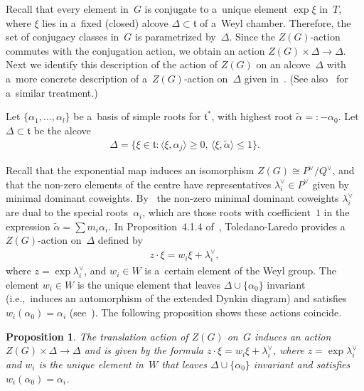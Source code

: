 \documentclass[pdftex]{sigma}
\numberwithin{equation}{section}
\newtheorem{Proposition}[Theorem]{Proposition}
{\theoremstyle{definition}
\newtheorem{Definition}[Theorem]{Definition}
\newtheorem{Example}[Theorem]{Example}
\newtheorem{Remark}[Theorem]{Remark}
}
\begin{document}
Recall that every element in~$G$ is conjugate to a~unique element $\exp \xi$ in~$T$, where $\xi$ lies in a~f\/ixed (closed)
alcove $\Delta \subset \mathfrak{t}$ of a~Weyl chamber.
Therefore, the set of conjugacy classes in~$G$ is parametrized by~$\Delta$.
Since the $Z(G)$-action commutes with the conjugation action, we obtain an action $Z(G)\times \Delta \to \Delta$.
Next we identify this description of the action of $Z(G)$ on an alcove~$\Delta$ with a~more concrete description of
a~$Z(G)$-action on~$\Delta$ given in~\cite[Section~4.1]{TL}.
(See also~\cite[Section~3.1]{BFM} for a~similar treatment.)

Let $\{\alpha_1, \ldots, \alpha_l \}$ be a~basis of simple roots for $\mathfrak{t}^*$, with highest root
$\tilde{\alpha}=:-\alpha_0$.
Let $\Delta \subset \mathfrak{t}$ be the alcove
\begin{gather*}
\Delta = \{\xi \in \mathfrak{t} \colon \langle \xi,\alpha_j\rangle \geq 0, \, \langle \xi, \tilde{\alpha}\rangle \leq 1
\}.
\end{gather*}

Recall that the exponential map induces an isomorphism $Z(G)\cong P^\vee/Q^\vee$, and that the non-zero elements of the
centre have representatives $\lambda_i^\vee \in P^\vee$ given by minimal dominant coweights.
By~\cite[Lemma~2.3]{TL} the non-zero minimal dominant coweights $\lambda_i^\vee$ are dual to the special roots~$\alpha_i$, which are those roots with coef\/f\/icient~$1$ in the expression $\tilde{\alpha}=\sum m_i\alpha_i$.
In Proposition~4.1.4 of~\cite{TL}, Toledano-Laredo provides a~$Z(G)$-action on~$\Delta$ def\/ined by
\begin{gather*}
z\cdot \xi = w_i \xi + \lambda_i^\vee,
\end{gather*}
where $z=\exp \lambda_i^\vee$, and $w_i \in W$ is a~certain element of the Weyl group.
The element $w_i \in W$ is the unique element that leaves $\Delta \cup \{{\alpha_0} \}$ invariant (i.e.,~induces an
automorphism of the extended Dynkin diagram) and satisf\/ies $w_i({\alpha_0}) = \alpha_i$ (see~\cite[Proposition 4.1.2]{TL}).
The following proposition shows these actions coincide.

\begin{Proposition}
\label{prop:action}
The translation action of $Z(G)$ on~$G$ induces an action $Z(G) \times \Delta \to \Delta$ and is given by the formula
$z\cdot \xi = w_i \xi + \lambda_i^\vee$, where $z=\exp \lambda_i^\vee$ and $w_i$ is the unique element in~$W$ that
leaves $\Delta \cup \{{\alpha_0} \}$ invariant and satisfies $w_i({\alpha_0}) = \alpha_i$.
\end{Proposition}
\end{document}
